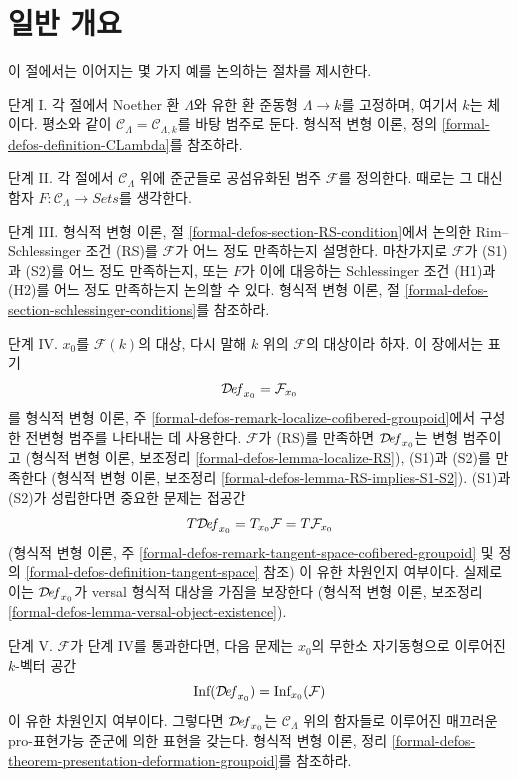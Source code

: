 \section{일반 개요}
\label{section-general}

\noindent
이 절에서는 이어지는 몇 가지 예를 논의하는 절차를 제시한다.

\medskip\noindent
단계 I. 각 절에서 Noether 환 $\Lambda$와 유한 환 준동형
$\Lambda \to k$를 고정하며, 여기서 $k$는 체이다. 평소와 같이
$\mathcal{C}_\Lambda = \mathcal{C}_{\Lambda, k}$를 바탕 범주로 둔다.
형식적 변형 이론, 정의 \ref{formal-defos-definition-CLambda}를 참조하라.

\medskip\noindent
단계 II. 각 절에서 $\mathcal{C}_\Lambda$ 위에 준군들로 공섬유화된
범주 $\mathcal{F}$를 정의한다. 때로는 그 대신 함자
$F : \mathcal{C}_\Lambda \to \textit{Sets}$를 생각한다.

\medskip\noindent
단계 III. 형식적 변형 이론, 절
\ref{formal-defos-section-RS-condition}에서 논의한
Rim--Schlessinger 조건 (RS)를 $\mathcal{F}$가 어느 정도 만족하는지
설명한다. 마찬가지로 $\mathcal{F}$가 (S1)과 (S2)를 어느 정도 만족하는지,
또는 $F$가 이에 대응하는 Schlessinger 조건 (H1)과 (H2)를 어느 정도
만족하는지 논의할 수 있다. 형식적 변형 이론, 절
\ref{formal-defos-section-schlessinger-conditions}를 참조하라.

\medskip\noindent
단계 IV. $x_0$를 $\mathcal{F}(k)$의 대상, 다시 말해 $k$ 위의
$\mathcal{F}$의 대상이라 하자. 이 장에서는 표기
$$
\mathcal{D}\!\mathit{ef}_{x_0} = \mathcal{F}_{x_0}
$$
를 형식적 변형 이론, 주
\ref{formal-defos-remark-localize-cofibered-groupoid}에서 구성한
전변형 범주를 나타내는 데 사용한다. $\mathcal{F}$가 (RS)를 만족하면
$\mathcal{D}\!\mathit{ef}_{x_0}$는 변형 범주이고
(형식적 변형 이론, 보조정리 \ref{formal-defos-lemma-localize-RS}),
(S1)과 (S2)를 만족한다
(형식적 변형 이론, 보조정리 \ref{formal-defos-lemma-RS-implies-S1-S2}).
(S1)과 (S2)가 성립한다면 중요한 문제는 접공간
$$
T\mathcal{D}\!\mathit{ef}_{x_0} = T_{x_0}\mathcal{F} = T\mathcal{F}_{x_0}
$$
(형식적 변형 이론, 주
\ref{formal-defos-remark-tangent-space-cofibered-groupoid} 및
정의 \ref{formal-defos-definition-tangent-space} 참조)
이 유한 차원인지 여부이다. 실제로 이는
$\mathcal{D}\!\mathit{ef}_{x_0}$가 versal 형식적 대상을 가짐을 보장한다
(형식적 변형 이론, 보조정리
\ref{formal-defos-lemma-versal-object-existence}).

\medskip\noindent
단계 V. $\mathcal{F}$가 단계 IV를 통과한다면, 다음 문제는 $x_0$의
무한소 자기동형으로 이루어진 $k$-벡터 공간
$$
\text{Inf}(\mathcal{D}\!\mathit{ef}_{x_0}) = \text{Inf}_{x_0}(\mathcal{F})
$$
이 유한 차원인지 여부이다. 그렇다면
$\mathcal{D}\!\mathit{ef}_{x_0}$는 $\mathcal{C}_\Lambda$ 위의 함자들로 이루어진
매끄러운 pro-표현가능 준군에 의한 표현을 갖는다. 형식적 변형 이론, 정리
\ref{formal-defos-theorem-presentation-deformation-groupoid}를 참조하라.




